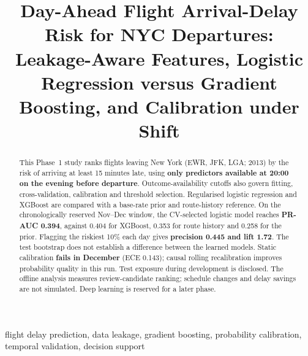 \documentclass[conference]{IEEEtran}
\begin{document}
\title{Day-Ahead Flight Arrival-Delay Risk for NYC Departures:\\
Leakage-Aware Features, Logistic Regression versus Gradient Boosting, and Calibration under Shift}

\author{
}

\maketitle

\begin{abstract}
This Phase~1 study ranks flights leaving New York (EWR, JFK, LGA; 2013) by the risk of arriving at least 15 minutes late, using \textbf{only predictors available at 20:00 on the evening before departure}. Outcome-availability cutoffs also govern fitting, cross-validation, calibration and threshold selection. Regularised logistic regression and XGBoost are compared with a base-rate prior and route-history reference. On the chronologically reserved Nov--Dec window, the CV-selected logistic model reaches \textbf{PR-AUC 0.394}, against 0.404 for XGBoost, 0.353 for route history and 0.258 for the prior. Flagging the riskiest 10\% each day gives \textbf{precision 0.445 and lift 1.72}. The test bootstrap does not establish a difference between the learned models. Static calibration \textbf{fails in December} (ECE 0.143); causal rolling recalibration improves probability quality in this run. Test exposure during development is disclosed. The offline analysis measures review-candidate ranking; schedule changes and delay savings are not simulated. Deep learning is reserved for a later phase.
\end{abstract}

\begin{IEEEkeywords}
flight delay prediction, data leakage, gradient boosting, probability calibration, temporal validation, decision support
\end{IEEEkeywords}
\end{document}
